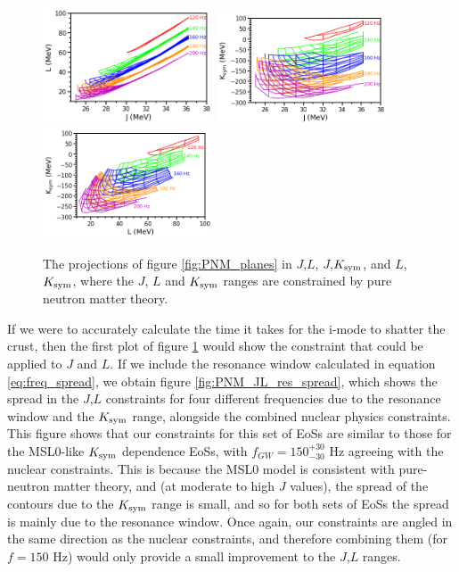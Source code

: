 \documentclass[fleqn,usenatbib]{mnras}
\begin{document}
\begin{figure}
\centering
\includegraphics[width=0.45\textwidth,angle=0]{PNM_JL}
\includegraphics[width=0.45\textwidth,angle=0]{PNM_JK}
\includegraphics[width=0.45\textwidth,angle=0]{PNM_LK}
\caption{The projections of figure \ref{fig:PNM_planes} in $J$,$L$, $J$,$K_{\rm sym}$, and $L$,$K_{\rm sym}$, where the $J$, $L$ and $K_{\rm sym}$ ranges are constrained by pure neutron matter theory.}
\label{fig:PNM_2d}
\end{figure}

\hspace{\parindent}If we were to accurately calculate the time it takes for the i-mode to shatter the crust, then the first plot of figure \ref{fig:PNM_2d} would show the constraint that could be applied to $J$ and $L$. If we include the resonance window calculated in equation \ref{eq:freq_spread}, we obtain figure \ref{fig:PNM_JL_res_spread}, which shows the spread in the $J$,$L$ constraints for four different frequencies due to the resonance window and the $K_{\rm sym}$ range, alongside the combined nuclear physics constraints. This figure shows that our constraints for this set of EoSs are similar to those for the MSL0-like $K_{\rm sym}$ dependence EoSs, with $f_{GW}=150^{+30}_{-30}$ Hz agreeing with the nuclear constraints. This is because the MSL0 model is consistent with pure-neutron matter theory, and (at moderate to high $J$ values), the spread of the contours due to the $K_{\rm sym}$ range is small, and so for both sets of EoSs the spread is mainly due to the resonance window. Once again, our constraints are angled in the same direction as the nuclear constraints, and therefore combining them (for $f=150$ Hz) would only provide a small improvement to the $J$,$L$ ranges.
\end{document}
